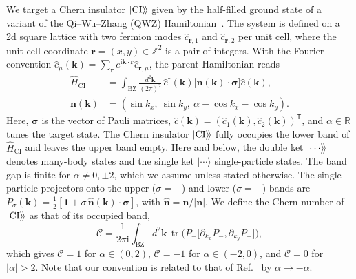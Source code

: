 \documentclass[aps,prb,10pt,twocolumn,superscriptaddress,longbibliography,floatfix]{revtex4-2}
\newcommand{\ii}{\mathrm{i}}
\newcommand{\mc}[1]{\mathcal{#1}}
\newcommand{\mr}[1]{\mathrm{#1}}
\newcommand{\Id}{\mathbf{1}}
\newcommand{\bfr}{\boldsymbol r}
\newcommand{\bk}{\boldsymbol k}
\newcommand{\kett}[1]{\ket{#1}\!\rangle}
\newcommand{\CI}{\kett{\mr{CI}}}
\begin{document}
We target a Chern insulator $\CI$ given by the half-filled ground state of a variant of the Qi--Wu--Zhang (QWZ) Hamiltonian~\cite{QiWuZhang2006}. The system is defined on a 2d square lattice with two fermion modes $\hat c_{\bfr,1}$ and $\hat c_{\bfr,2}$ per unit cell, where the unit-cell coordinate $\bfr=(x,y)\in\mathbb Z^2$ is a pair of integers. With the Fourier convention $\hat c_\mu(\bk)=\sum_{\bfr}e^{\ii\bk\cdot\bfr}\hat c_{\bfr,\mu}$, the parent Hamiltonian reads
\begin{align}
    \hat H_{\mr{CI}}&=\int_{\mr{BZ}}\frac{d^2\bk}{(2\pi)^2}\,
    \hat c^\dagger(\bk)\big[\boldsymbol n(\bk)\cdot\boldsymbol\sigma\big]\hat c(\bk),\nonumber\\
    \boldsymbol n(\bk)&=(\sin k_x,\ \sin k_y,\ \alpha-\cos k_x-\cos k_y).
    \label{eq:QWZ}
\end{align}
Here, $\boldsymbol\sigma$ is the vector of Pauli matrices, $\hat c(\bk)=(\hat c_1(\bk),\hat c_2(\bk))^{\mathsf T}$, and $\alpha\in\mathbb R$ tunes the target state. The Chern insulator $\CI$ fully occupies the lower band of $\hat H_{\mr{CI}}$ and leaves the upper band empty.  Here and below, the double ket $\kett{\cdots}$ denotes many-body states and the single ket $|\cdots\rangle$ single-particle states. The band gap is finite for $\alpha\neq0,\pm2$, which we assume unless stated otherwise. The single-particle projectors onto the upper ($\sigma=+$) and lower ($\sigma=-$) bands are $P_\sigma(\bk)=\frac12[\Id+\sigma\,\hat{\boldsymbol n}(\bk)\cdot\boldsymbol\sigma]$, with $\hat{\boldsymbol n}=\boldsymbol n/|\boldsymbol n|$.
We define the Chern number of $\CI$ as that of its occupied band,
\begin{equation}
    \mc C=\frac{1}{2\pi\ii}\int_{\mr{BZ}}d^2\bk\,
    \operatorname{tr}\!\Big(P_-\big[\partial_{k_x}P_-,\partial_{k_y}P_-\big]\Big),
    \label{eq:ChernNumber}
\end{equation}
which gives $\mc C=1$ for $\alpha\in(0,2)$, $\mc C=-1$ for $\alpha\in(-2,0)$, and $\mc C=0$ for $|\alpha|>2$. Note that our convention is related to that of Ref.~\cite{BhuiyanPanJian2026} by $\alpha\to-\alpha$.
\end{document}
